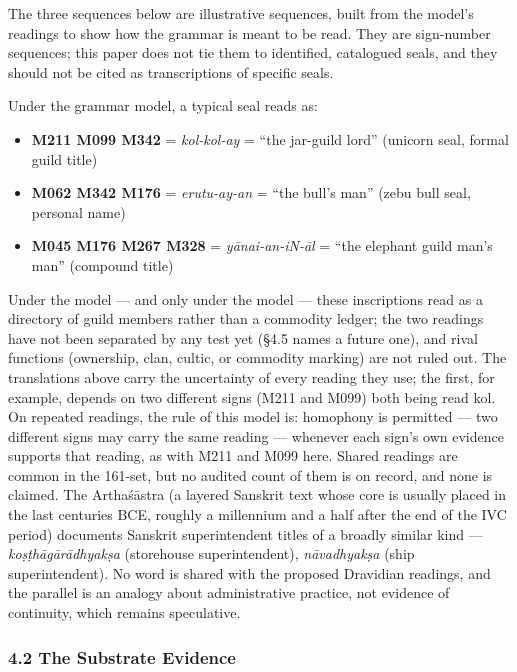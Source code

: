 \documentclass[
]{article}
\newcounter{none} %
\providecommand{\tightlist}{%
  \setlength{\itemsep}{0pt}\setlength{\parskip}{0pt}}
\begin{document}
The three sequences below are illustrative sequences, built from the model's readings to show how the grammar is meant to be read. They are sign-number sequences; this paper does not tie them to identified, catalogued seals, and they should not be cited as transcriptions of specific seals.

Under the grammar model, a typical seal reads as:

\begin{itemize}
\tightlist
\item
  \textbf{M211 M099 M342} = \emph{kol-kol-ay} = ``the jar-guild lord''
  (unicorn seal, formal guild title)
\item
  \textbf{M062 M342 M176} = \emph{erutu-ay-an} = ``the bull's man''
  (zebu bull seal, personal name)
\item
  \textbf{M045 M176 M267 M328} = \emph{yānai-an-iN-āl} = ``the elephant
  guild man's man'' (compound title)
\end{itemize}

Under the model --- and only under the model --- these inscriptions read as a directory of guild members rather than a commodity ledger; the two readings have not been separated by any test yet (§4.5 names a future one), and rival functions (ownership, clan, cultic, or commodity marking) are not ruled out. The translations above carry the uncertainty of every reading they use; the first, for example, depends on two different signs (M211 and M099) both being read kol. On repeated readings, the rule of this model is: homophony is permitted --- two different signs may carry the same reading --- whenever each sign's own evidence supports that reading, as with M211 and M099 here. Shared readings are common in the 161-set, but no audited count of them is on record, and none is claimed. The Arthaśāstra (a layered Sanskrit text whose core is usually placed in the last centuries BCE, roughly a millennium and a half after the end of the IVC period) documents Sanskrit superintendent titles of a broadly similar kind --- \emph{koṣṭhāgārādhyakṣa} (storehouse superintendent), \emph{nāvadhyakṣa} (ship superintendent). No word is shared with the proposed Dravidian readings, and the parallel is an analogy about administrative practice, not evidence of continuity, which remains speculative.

\subsubsection{4.2 The Substrate Evidence}\label{the-substrate-evidence}
\end{document}
